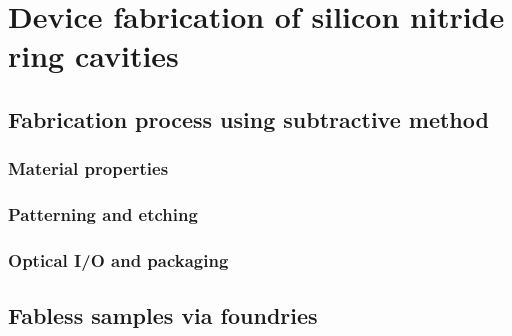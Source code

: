 
\chapter{Device fabrication of silicon nitride ring cavities}


\section{Fabrication process using subtractive method}

\subsection{Material properties}
\subsection{Patterning and etching}
\subsection{Optical I/O and packaging}

\section{Fabless samples via foundries}


